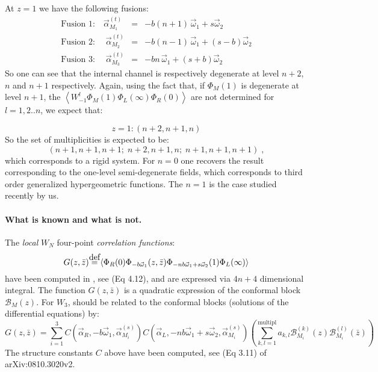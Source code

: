 \documentclass[12pt,a4paper]{article}
\newcommand\mydef{\stackrel{\mathclap{\normalfont\mbox{def}}}{=}}
\newcommand{\< }{{\langle}}
\renewcommand{\>}{{\rangle}}
\newcommand{\cB}{\mathcal{B}}
\newcommand{\0}{\textbf{0.}}
\newcommand{\1}{\textbf{1.}}
\newcommand{\2}{\textbf{2.}}
\newcommand{\3}{\textbf{3.}}
\newcommand{\4}{\textbf{4.}}
\newcommand{\5}{\textbf{5.}}
\newcommand{\6}{\textbf{6.}}
\newcommand{\7}{\textbf{7.}}
\newcommand{\8}{\textbf{8.}}
\newcommand{\9}{\textbf{9.}}
\begin{document}
At $z=1$ we have the following fusions:
 \begin{eqnarray}
\text{Fusion 1:}\quad 
\vec{\alpha}_{M_1}^{(t)} &=& - b(n+1) \,     \vec{\omega}_1 +s \vec{\omega}_2 \\
\text{Fusion 2:}\; \quad 
      \vec{\alpha}_{M_2}^{(t)} &=& - b(n-1) \,     \vec{\omega}_1 +(s-b) \vec{\omega}_2    \\
\text{Fusion 3:}\;\quad
\vec{\alpha}_{M_{3}}^{(t)} &=& - b n \,     \vec{\omega}_1 +(s+b) \vec{\omega}_2  
\end{eqnarray} 
So one can see that the internal channel is respectively degenerate at level $n+2$, $n$ and $n+1$ respectively. 
Again, using the fact that, if $\Phi_{M}(1)$ is degenerate at level $n+1$, the  $\left< W_{-1}^{l}\Phi_{M}(1) \Phi_{L}(\infty) \Phi_{R}(0)\right>$ are not determined for $l=1,2..n$, we expect that:
 
 \begin{equation}
 z=1: (n+2,n+1,n) 
 \end{equation}
 So the set of multiplicities is expected to be:
 \begin{equation}
 (n+1,n+1,n+1;\; n+2,n+1,n;\; n+1,n+1,n+1)\;,
\end{equation} 
which corresponds to a rigid system. 
For $n=0$ one recovers the result corresponding to the one-level semi-degenerate fields, which corresponds to third order generalized hypergeometric functions. The $n=1$ is the case studied recently by us. 



\paragraph{What is known and what is not.}

The {\it local} $W_N$ four-point {\it correlation functions}:
\begin{equation}
G(z,\bar{z})\mydef\left< \Phi_{R}(0) \Phi_{-b \vec{\omega}_1}(z,\bar{z})\Phi_{- n b \vec{\omega}_1+s \vec{\omega}_2}(1)\Phi_{L}(\infty) \right>
\end{equation}
have been computed in \cite{fl08}, see (Eq 4.12),  and are expressed via {\bf $4 n +4$} dimensional integral. The function $G(z,\bar{z})$ is  a quadratic expression of the conformal block $\cB_M(z)$. For $W_3$, should be related to the conformal blocks (solutions of the differential equations) by:
\begin{equation}
G(z,\bar{z}) = \sum_{i=1}^{3} C(\vec{\alpha}_R, -b\vec{\omega}_1, \vec{\alpha}^{(s)}_{M_i})C(\vec{\alpha}_L, -n b\vec{\omega}_1+s \vec{\omega}_2, \vec{\alpha}^{(s)}_{M_i})\left( \sum_{k,l=1}^{\text{multipl}}a_{k,l}\cB^{(k)}_{M_i}(z)\cB^{(l)}_{M_i}(\bar{z}) \right)
\end{equation}
The structure constants $C$ above have been computed, see (Eq 3.11) of arXiv:0810.3020v2. 
\end{document}
